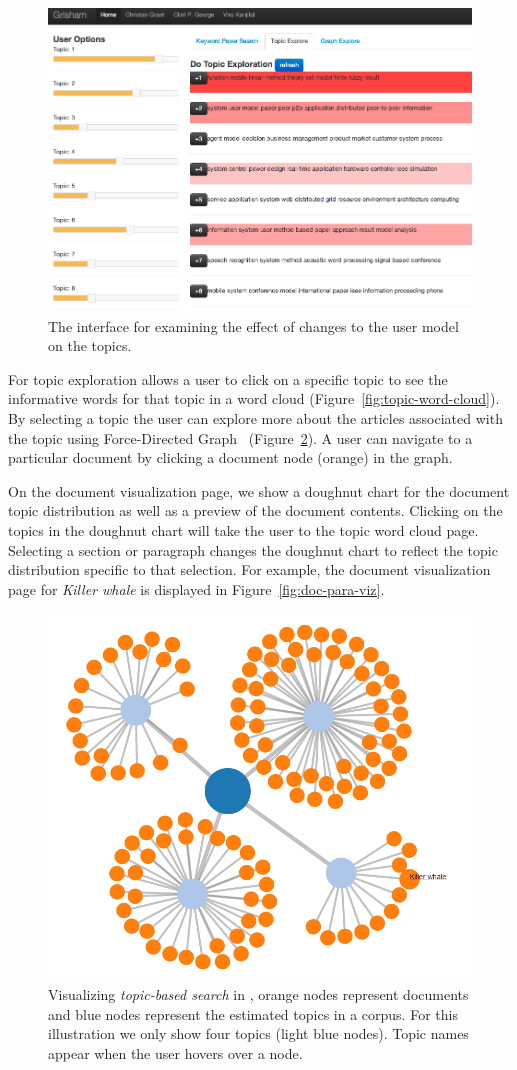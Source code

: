 \begin{figure}[htb]\centering
\includegraphics[width=.45\textwidth]{images/topic_exploration.png} %
\caption{The interface for examining the effect of changes to the user model on the topics.}
\label{fig:topic_exploration}
\end{figure}

For topic exploration \system allows a user to click on a specific 
topic to see the informative words for that topic in a word cloud 
(Figure~\ref{fig:topic-word-cloud}). By selecting a topic the user 
can explore more about the articles associated with the topic using 
Force-Directed Graph~\cite{2011-d3} (Figure~\ref{fig:topic-search-viz}).
A user can navigate to a particular document by clicking a document 
node (orange) in the graph. 

On the document visualization page, we show a doughnut chart for the document topic distribution as well as a preview of the document contents.
Clicking on the topics in the doughnut chart will take the user to the topic word cloud page.
Selecting a section or paragraph changes the doughnut chart to reflect the topic distribution specific to that selection.
For example, the document visualization page for \textit{Killer whale} is displayed in Figure~\ref{fig:doc-para-viz}.





\begin{figure}[htb]\centering 
\includegraphics[width=.5\textwidth]{images/topical_docs.png}
\caption{Visualizing \textsl{topic-based search} in \system, orange 
nodes represent documents and blue nodes represent the estimated 
topics in a corpus. For this illustration we only show four topics 
(light blue nodes). Topic names appear when the user hovers over a 
node.}
\label{fig:topic-search-viz}
\end{figure}

